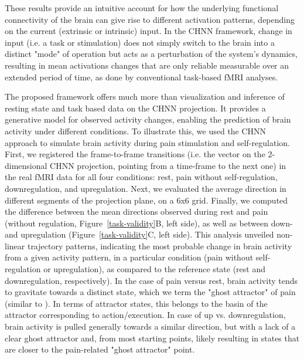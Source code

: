 \documentclass{article}
\begin{document}
These results provide an intuitive account for how the underlying functional connectivity of the brain can give rise to
different activation patterns, depending on the current (extrinsic or intrinsic) input. In the CHNN framework, change in
input (i.e. a task or stimulation) does not simply switch to the brain into a distinct "mode" of operation but acts as
a perturbation of the system's dynamics, resulting in mean activations changes that are only reliable measurable over
an extended period of time, as done by conventional task-based fMRI analyses.

The proposed framework offers much more than visualization and inference of resting state and task based data on the
CHNN projection. It provides a generative model for observed activity changes, enabling the prediction of brain
activity under different conditions. To illustrate this, we used the CHNN approach to simulate brain activity during pain
stimulation and self-regulation. First, we registered the frame-to-frame transitions (i.e. the vector on the 2-dimensional CHNN projection, pointing from a time-frame to the next one) in the real fMRI data for all four
conditions: rest, pain without self-regulation, downregulation, and upregulation.
Next, we evaluated the average direction in different segments of the projection plane, on a 6x6 grid. Finally, we
computed the difference between the mean directions observed during rest and pain (without regulation,
Figure~\ref{task-validity}B, left side), as well as between down- and upregulation (Figure~\ref{task-validity}C, left side).
This analysis unveiled non-linear trajectory patterns, indicating the most probable change in brain activity from a
given activity pattern, in a particular condition (pain without self-regulation or upregulation), as
compared to the reference state (rest and downregulation, respectively). In the case of pain versus rest, brain
activity tends to gravitate towards a distinct state, which we term the "ghost attractor" of pain (similar to \cite{vohryzek2020ghost}). In terms of attractor states, this belongs to the basin of the
attractor corresponding to action/execution. In case of up vs. downregulation, brain activity is pulled generally
towards a similar direction, but with a lack of a clear ghost attractor and, from most starting points, likely resulting in states that are closer to the pain-related "ghost attractor" point.
\end{document}
